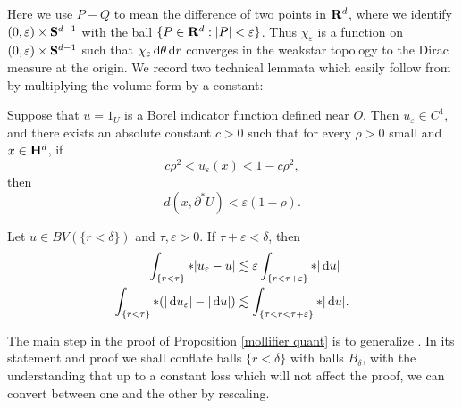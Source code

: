 Here we use $P - Q$ to mean the difference of two points in $\mathbf{R}^d$, where we identify $(0, \varepsilon) \times \mathbf S^{d - 1}$ with the ball $\{P \in \mathbf{R}^d: |P| < \varepsilon\}$.
Thus $\chi_\varepsilon$ is a function on $(0, \varepsilon) \times \mathbf S^{d - 1}$ such that $\chi_\varepsilon \mathop{}\!\mathrm{d} \theta \mathop{}\!\mathrm{d} r$ converges in the weakstar topology to the Dirac measure at the origin.
We record two technical lemmata which easily follow from \cite[Lemmata 7.1--7.2]{Giusti77} by multiplying the volume form by a constant:

\begin{lemma}\label{Giusti71}
Suppose that $u = 1_U$ is a Borel indicator function defined near $O$. Then $u_\varepsilon \in C^1$, and there exists an absolute constant $c > 0$ such that for every $\rho > 0$ small and $x \in \mathbf H^d$, if
$$c\rho^2 < u_\varepsilon(x) < 1 - c\rho^2,$$
then
\begin{equation}\label{Giusti71 claim}
d(x, \partial^* U) < \varepsilon(1 - \rho).
\end{equation}
\end{lemma}

\begin{lemma}\label{Giusti72}
Let $u \in BV(\{r < \delta\})$ and $\tau, \varepsilon > 0$. If $\tau + \varepsilon < \delta$, then
\begin{align*}
\int_{\{r < \tau\}} *|u_\varepsilon - u| &\lesssim \varepsilon \int_{\{r < \tau + \varepsilon\}} *|\mathop{}\!\mathrm{d} u|\\
\int_{\{r < \tau\}} *(|\mathop{}\!\mathrm{d} u_\varepsilon| - |\mathop{}\!\mathrm{d} u|) &\lesssim \int_{\{\tau < r < \tau + \varepsilon\}} *|\mathop{}\!\mathrm{d} u|.
\end{align*}
\end{lemma}

The main step in the proof of Proposition \ref{mollifier quant} is to generalize \cite[Theorem 7.3, Remark 7.4]{Giusti77}.
In its statement and proof we shall conflate balls $\{r < \delta\}$ with balls $B_\delta$, with the understanding that up to a constant loss which will not affect the proof, we can convert between one and the other by rescaling.

